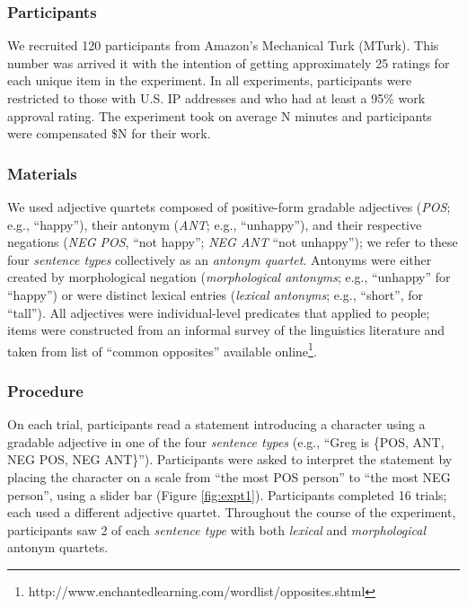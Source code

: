 \documentclass[10pt,letterpaper]{article}
\newcommand{\figref}[1]{Figure \ref{#1}}
\begin{document}
\subsubsection{Participants}

We recruited 120 participants from Amazon's Mechanical Turk (MTurk). 
This number was arrived it with the intention of getting approximately 25 ratings for each unique item in the experiment.
In all experiments, participants were restricted to those with U.S. IP addresses and who had at least a 95\% work approval rating. 
The experiment took on average N minutes and participants were compensated \$N for their work.

\subsubsection{Materials}

We used adjective quartets composed of positive-form gradable adjectives (\emph{POS}; e.g., ``happy''), their antonym (\emph{ANT}; e.g., ``unhappy''), and their respective negations (\emph{NEG POS}, ``not happy''; \emph{NEG ANT} ``not unhappy''); we refer to these four \emph{sentence types} collectively as an \emph{antonym quartet}.
Antonyms were either created by morphological negation (\emph{morphological antonyms}; e.g., ``unhappy'' for ``happy'') or were distinct lexical entries (\emph{lexical antonyms}; e.g., ``short'', for ``tall'').
All adjectives were individual-level predicates that applied to people; items were constructed from an informal survey of the linguistics literature and taken from list of ``common opposites'' available online\footnote{http://www.enchantedlearning.com/wordlist/opposites.shtml}.

\subsubsection{Procedure}

On each trial, participants read a statement introducing a character using a gradable adjective in one of the four \emph{sentence types} (e.g., ``Greg is \{POS, ANT, NEG POS, NEG ANT\}'').
Participants were asked to interpret the statement by placing the character on a scale from ``the most POS person'' to ``the most NEG person'', using a slider bar (\figref{fig:expt1}).
Participants completed 16 trials; each used a different adjective quartet.
Throughout the course of the experiment, participants saw 2 of each \emph{sentence type} with both \emph{lexical} and \emph{morphological} antonym quartets. 
\end{document}
